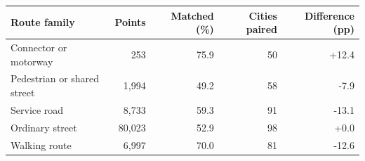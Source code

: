 \begin{tabular}{lrrrr}
\toprule
Route family & Points & Matched (\%) & Cities paired & Difference (pp) \\
\midrule
Connector or motorway & 253 & 75.9 & 50 & +12.4 \\
Pedestrian or shared street & 1,994 & 49.2 & 58 & -7.9 \\
Service road & 8,733 & 59.3 & 91 & -13.1 \\
Ordinary street & 80,023 & 52.9 & 98 & +0.0 \\
Walking route & 6,997 & 70.0 & 81 & -12.6 \\
\bottomrule
\end{tabular}
